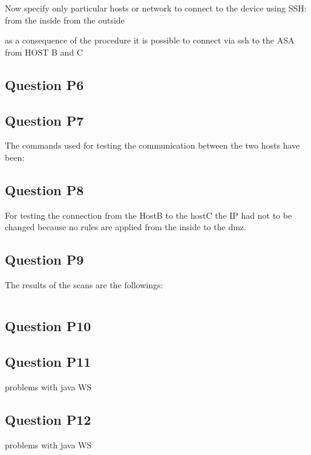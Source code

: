 Now specify only particular hosts or network to connect to the device using SSH:
from the inside
from the outside

as a consequence of the procedure it is possible to connect via ssh to the ASA from HOST B and C

\subsection{Question P6}

\subsection{Question P7}
The commands used for testing the communication between the two hosts have been:

\subsection{Question P8}
For testing the connection from the HostB to the hostC the IP had not to be changed because no rules are applied from the inside to the dmz.

\subsection{Question P9}
The results of the scans are the followings:

\inputminted{text}{nmap_HC_sA.txt}
\label{conf:Q_P2}

\subsection{Question P10}


\subsection{Question P11}
problems with java WS

\subsection{Question P12}
problems with java WS